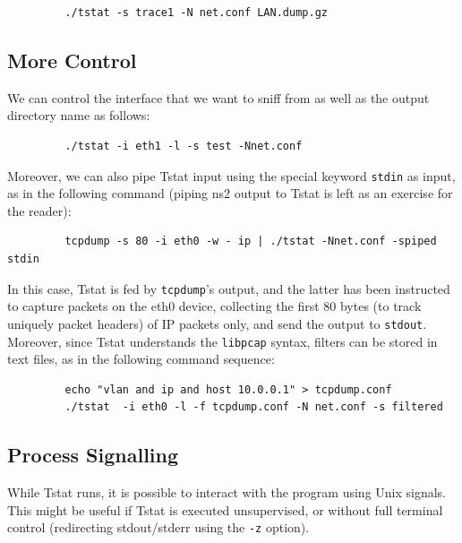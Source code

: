 \documentclass[11pt]{article}
\begin{document}
\begin{small}\begin{verbatim}
         ./tstat -s trace1 -N net.conf LAN.dump.gz
\end{verbatim}\end{small} \noindent
\subsection{More Control\label{More_Control}}


We can control the interface that we want to sniff from as well as
the output directory name as follows:

\begin{small}\begin{verbatim}
         ./tstat -i eth1 -l -s test -Nnet.conf
\end{verbatim}\end{small} \noindent
Moreover, we can also pipe Tstat input using the special keyword
\texttt{stdin} as input, as in the following command (piping ns2 output to 
Tstat is left as an exercise for the reader):

\begin{small}\begin{verbatim}
         tcpdump -s 80 -i eth0 -w - ip | ./tstat -Nnet.conf -spiped stdin
\end{verbatim}\end{small} \noindent
In this case, Tstat is fed by \texttt{tcpdump}'s output, and the latter has been
instructed to capture packets on the eth0 device, collecting the
first 80 bytes (to track uniquely packet headers) of IP packets only, 
and send the output to \texttt{stdout}. Moreover, since Tstat understands 
the \texttt{libpcap} syntax, filters can be stored in text files, as in 
the following command sequence:

\begin{small}\begin{verbatim}
         echo "vlan and ip and host 10.0.0.1" > tcpdump.conf
         ./tstat  -i eth0 -l -f tcpdump.conf -N net.conf -s filtered
\end{verbatim}\end{small} \noindent
\subsection{Process Signalling\label{Process_Signalling}}


While Tstat runs, it is possible to interact with the program using Unix signals. 
This might be useful if Tstat is executed unsupervised, or without full terminal control 
(redirecting stdout/stderr using the \texttt{-z} option).
\end{document}
